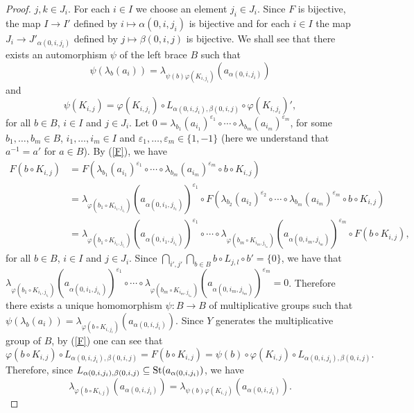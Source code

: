 \begin{proof}
	$j,k\in J_{i}$. For each $i\in I$ we choose an element $j_i\in
	J_{i}$. Since $F$ is bijective, the map $I\rightarrow I'$ defined by
	$i\mapsto \alpha(0,i,j_i)$ is bijective and for each $i\in I$ the
	map $J_i\rightarrow J'_{\alpha(0,i,j_i)}$ defined by $j\mapsto
	\beta(0,i,j)$ is bijective. We shall see that there exists an
	automorphism $\psi$ of the left brace $B$ such that
	$$\psi(\lambda_b(a_i))=\lambda_{\psi(b)\varphi(K_{i,j_i})}(a_{\alpha(0,i,j_i)})$$
	and
	$$\psi(K_{i,j})=\varphi(K_{i,j_i})\circ L_{\alpha(0,i,j_i),\beta(0,i,j)}\circ \varphi(K_{i,j_i})',$$
	for all $b\in B$, $i\in I$ and $j\in J_i$. Let
	$0=\lambda_{b_1}(a_{i_1})^{\varepsilon_1}\circ \cdots\circ
	\lambda_{b_m}(a_{i_m})^{\varepsilon_m}$, for some $b_1,\dots ,b_m\in
	B$, $i_1,\dots ,i_m\in I$ and $\varepsilon_1,\dots ,\varepsilon_m\in
	\{ 1,-1\}$ (here we understand that $a^{-1}=a'$ for $a\in B$). By (\ref{F}), we have
	\begin{align*}
		F(b\circ K_{i,j})&=F(\lambda_{b_1}(a_{i_1})^{\varepsilon_1}\circ \cdots\circ 
		\lambda_{b_m}(a_{i_m})^{\varepsilon_m}\circ b\circ K_{i,j})\\
		&=\lambda_{\varphi(b_1\circ K_{i_1,j_{i_1}})}(a_{\alpha(0,i_1,j_{i_1})})^{\varepsilon_1}\circ F(\lambda_{b_2}(a_{i_2})^{\varepsilon_2}\circ \cdots\circ 
		\lambda_{b_m}(a_{i_m})^{\varepsilon_m}\circ b\circ K_{i,j})\\
		&=\lambda_{\varphi(b_1\circ K_{i_1,j_{i_1}})}(a_{\alpha(0,i_1,j_{i_1})})^{\varepsilon_1}\circ \cdots\circ 
		\lambda_{\varphi(b_m\circ K_{i_m,j_{i_m}})}(a_{\alpha(0,i_m,j_{i_m})})^{\varepsilon_m}\circ F(b\circ K_{i,j}),
	\end{align*}
	for all $b\in B$, $i\in I$ and $ j\in J_i$. Since
	$\bigcap_{i',j'}\bigcap_{b\in B}b\circ L_{j,l}\circ b'=\{ 0\}$, we have that
	$\lambda_{\varphi(b_1\circ K_{i_1,j_{i_1}})}(a_{\alpha(0,i_1,j_{i_1})})^{\varepsilon_1}\circ \cdots\circ 
	\lambda_{\varphi(b_m\circ K_{i_m,j_{i_m}})}(a_{\alpha(0,i_m,j_{i_m})})^{\varepsilon_m}=0$.
	Therefore there exists a unique homomorphism $\psi\colon B\rightarrow B$
	of multiplicative groups such that
	$\psi(\lambda_b(a_i))=\lambda_{\varphi(b\circ K_{i,j_{i}})}(a_{\alpha(0,i,j_i)})$.
	Since $Y$ generates the multiplicative group of $B$, by (\ref{F})
	one can see that
	$$\varphi(b\circ K_{i,j})\circ L_{\alpha(0,i,j_i),\beta(0,i,j)}=F(b\circ K_{i,j})=\psi(b)\circ \varphi(K_{i,j})\circ L_{\alpha(0,i,j_i),\beta(0,i,j)}.$$
	Therefore, since $L_{\alpha(0,i,j_i),\beta(0,i,j)}\subseteq
	\operatorname{St}(a_{\alpha(0,i,j_i)})$, we have
	$$\lambda_{\varphi(b\circ K_{i,j})}(a_{\alpha(0,i,j_i)})=\lambda_{\psi(b)\varphi(K_{i,j})}(a_{\alpha(0,i,j_i)}).$$

\end{proof}
